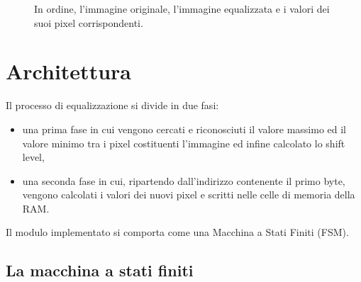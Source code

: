\documentclass[11pt]{article}
\begin{document}
\begin{figure}[ht]
        \caption{In ordine, l'immagine originale, l'immagine equalizzata e i valori dei suoi pixel corrispondenti.}
    
    \end{figure}
\newpage
\section{Architettura}
    Il processo di equalizzazione si divide in due fasi: 
    \begin{itemize}
        \item una prima fase in cui vengono cercati e riconosciuti il valore massimo ed il valore minimo tra i pixel costituenti l'immagine ed infine calcolato lo shift level, 
        \item una seconda fase in cui, ripartendo dall'indirizzo contenente il primo byte, vengono calcolati i valori dei nuovi pixel e scritti nelle celle di memoria della RAM.
    \end{itemize}
    
    Il modulo implementato si comporta come una Macchina a Stati Finiti (FSM).

    \subsection{La macchina a stati finiti}
    
\end{document}
